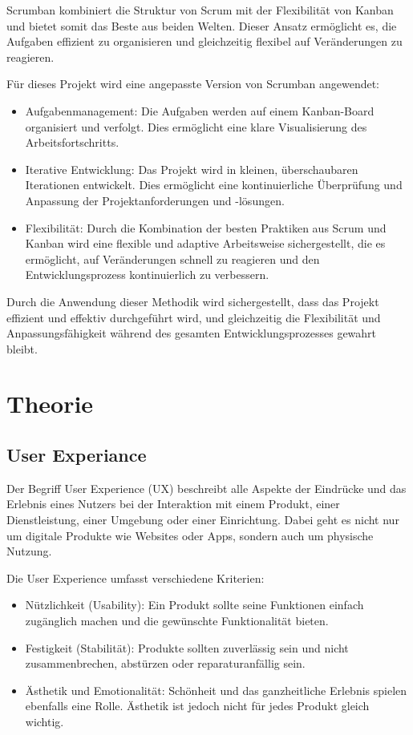 Scrumban kombiniert die Struktur von Scrum mit der Flexibilität von Kanban und bietet somit das Beste aus beiden Welten. Dieser Ansatz ermöglicht es, 
die Aufgaben effizient zu organisieren und gleichzeitig flexibel auf Veränderungen zu reagieren.

Für dieses Projekt wird eine angepasste Version von Scrumban angewendet:
\begin{itemize}
    \item Aufgabenmanagement: Die Aufgaben werden auf einem Kanban-Board organisiert und verfolgt. Dies ermöglicht eine klare Visualisierung des Arbeitsfortschritts.
    \item Iterative Entwicklung: Das Projekt wird in kleinen, überschaubaren Iterationen entwickelt. Dies ermöglicht eine kontinuierliche Überprüfung und Anpassung der Projektanforderungen und -lösungen.
    \item Flexibilität: Durch die Kombination der besten Praktiken aus Scrum und Kanban wird eine flexible und adaptive Arbeitsweise sichergestellt, die es ermöglicht, auf Veränderungen schnell zu reagieren und den Entwicklungsprozess kontinuierlich zu verbessern. 
\end{itemize}

Durch die Anwendung dieser Methodik wird sichergestellt, dass das Projekt effizient und effektiv durchgeführt wird, und gleichzeitig die Flexibilität und Anpassungsfähigkeit während des gesamten Entwicklungsprozesses gewahrt bleibt.

\section{Theorie} 


\subsection{ User Experiance }

Der Begriff User Experience (UX) beschreibt alle Aspekte der Eindrücke und das Erlebnis eines Nutzers bei der Interaktion mit einem Produkt, 
einer Dienstleistung, einer Umgebung oder einer Einrichtung. Dabei geht es nicht nur um digitale Produkte wie Websites oder Apps, sondern auch 
um physische Nutzung.

Die User Experience umfasst verschiedene Kriterien:

\begin{itemize}
    \item Nützlichkeit (Usability): Ein Produkt sollte seine Funktionen einfach zugänglich machen und die gewünschte Funktionalität bieten.
    \item Festigkeit (Stabilität): Produkte sollten zuverlässig sein und nicht zusammenbrechen, abstürzen oder reparaturanfällig sein.
    \item Ästhetik und Emotionalität: Schönheit und das ganzheitliche Erlebnis spielen ebenfalls eine Rolle. Ästhetik ist jedoch nicht für jedes Produkt gleich wichtig.

\end{itemize}

